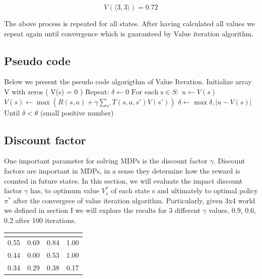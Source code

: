 \documentclass[10pt,a4paper,twocolumn]{article}
\begin{document}
	\begin{equation}
	 V(\big \langle 3,3 \big \rangle) = 0.72
	\end{equation}


	The above process is repeated for all states. After having calculated all values we repeat again until convergence which is guaranteed by Value iteration algorithm.
	\subsection{Pseudo code}
	Below we present the pseudo code algorigthm of Value Iteration.
	\newline
	Initialize array V with zeros ( V(s) = 0 )
	\newline
	Repeat:
	\newline
	$\delta \leftarrow 0$
	\newline
	$\text{For each s} \in S:$
	\newline
	$u \leftarrow V(s)$
	\newline
	$V(s) \leftarrow \max{ ( R(s,a) + \gamma \sum_{s'}T(s,a,s')V(s') )}$
	\newline
	$\delta \leftarrow \max{\delta, | u - V(s)|}$
	\newline
	Until $\delta < \theta$ (small positive number)
	
	
	\subsection{Discount factor}
	 One  important parameter for solving  MDPs is the discount factor $\gamma$. Discount factors are important in MDPs, in a sense they determine how the reward is counted in future states.
	 In this section, we will evaluate the impact discount factor $\gamma$ has, to optimum value $V_{s}^{*}$ of each state s and ultimately to optimal policy $\pi^{*} $ after the convergece of value iteration algorithm. Particularly, given 3x4 world we defined in section I we will explore the results for 3 different $\gamma$ values, 0.9, 0.6, 0.2 after 100 iterations.
	 
	\begin{center}
		\begin{tabular}{ c c c c}
			 \hline
			\multicolumn{4}{|c|}{  \text{$\gamma = 0.9$} } \\
			\hline
			0.55  & 0.69  & 0.84 & 1.00 \\ 
			0.44  & 0.00  & 0.53  & 1.00 \\  
			0.34 &  0.29 & 0.38 & 0.17    
		\end{tabular}
	\end{center}
	
\end{document}
